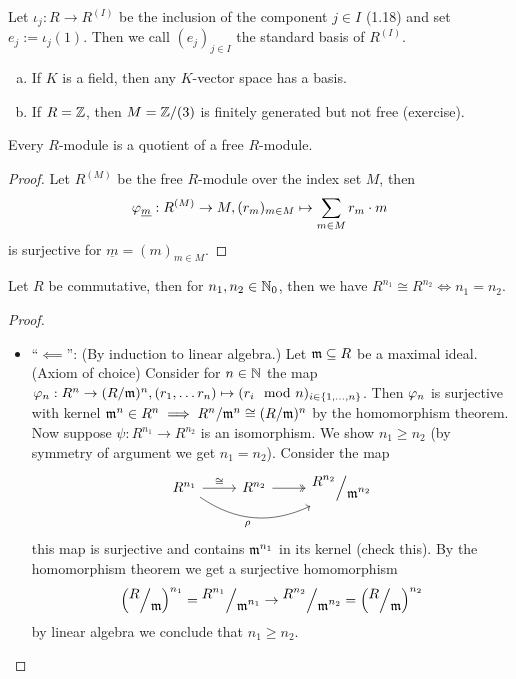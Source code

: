 \documentclass[a4paper]{report}
\begin{document}
\begin{rem*}
  Let $\iota_{j}: R \to R^{(I)}$ be the inclusion of the component $j \in I$ (1.18) and set $e_{j}:= \iota_{j}(1)$. Then we call $(e_{j})_{j \in I}$ the standard basis of $R^{(I)}$.
\end{rem*}
  \begin{exmp*}
\begin{enumerate}[(a)]
  \item If $K$ is a field, then any $K$-vector space has a basis.
        \item If $R = \mathbb{Z}$, then $M = \fak \Z{(3)}$ is finitely generated but not free (exercise).
\end{enumerate}

  \end{exmp*}
  \begin{rem}%
    Every $R$-module is a quotient of a free $R$-module.
\end{rem}
\begin{proof}
Let $R^{(M)}$ be the free $R$-module over the index set $M$, then \[\varphi_{\underline m}: R^{(M)} \to M, (r_{m})_{m \in M} \mapsto \sum_{m \in M}r_{m} \cdot m\] is surjective for $\underline m = (m)_{m \in M}$.
\end{proof}
\begin{thm}%
Let $R$ be commutative, then for $n_{1}, n_{2} \in \mathbb{N}_0$, then we have $R^{n_{1}} \cong R^{n_{2}} \iff n_{1} = n_{2}$.
\end{thm}
\begin{proof}
\begin{itemize}%
  \item ``$\impliedby$'': (By induction to linear algebra.) Let $\mathfrak{m} \subseteq R$ be a maximal ideal. (Axiom of choice) Consider for $n \in \mathbb{N}$ the map $\ph_{n}: R^{n} \to (\fak R\m)^{n}, (r_{1}, \ldots r_{n}) \mps (r_{i} \mod n)_{i \in \eb n}$. Then $\varphi_{n}$ is surjective with kernel $\m^{n} \in R^{n} \imp \fak{R^{n}}{\m^{n}} \cong (\fak R\m)^{n}$ by the homomorphism theorem. Now suppose $\psi: R^{n_{1}} \to R^{n_{2}}$ is an isomorphism. We show $n_{1} \ge n_{2}$ (by symmetry of argument we get $n_{1} = n_{2}$).
        Consider the map
        \[\begin{tikzcd}
R^{n_1} \arrow[r, "\cong"] \arrow[rr, "\rho"', bend right] & R^{n_2} \arrow[r, two heads] & \displaystyle\fak{R^{n_2}}{\m^{n_2}}
\end{tikzcd}\]
        this map is surjective and contains $\mathfrak{m}^{n_{1}}$ in its kernel (check this). By the homomorphism theorem we get a surjective homomorphism \[\l(\fak R\m\r)^{n_{1}} = \fak{R^{n_{1}}}{\m^{n_{1}}} \to \fak{R^{n_{2}}}{\m^{n_{2}}} = \l(\fak R\m\r)^{n_{2}}\]
        by linear algebra we conclude that $n_{1} \ge n_{2}$.
\end{itemize}
\end{proof}
\end{document}
